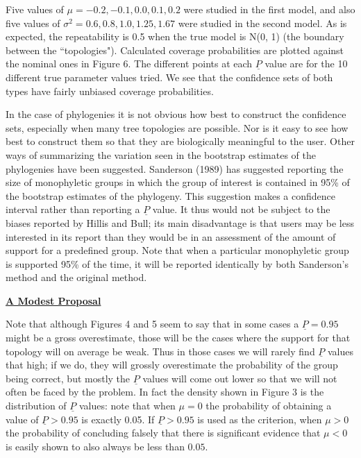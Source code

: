 {Five values of $\mu= -0.2, -0.1, 0.0, 0.1, 0.2$ were studied in the first model,
and also
five values of $\sigma^2 = 0.6, 0.8, 1.0, 1.25, 1.67$ were studied in the
second model.
As is expected, the repeatability is 0.5 when the true model is N(0, 1) (the
boundary between the ``topologies").
Calculated coverage probabilities are plotted against the nominal ones
in Figure 6.  The different
points at each $\underline{P}$ value are for the 10 different true parameter values tried.
We see that the confidence sets of both types have fairly unbiased coverage
probabilities.

In the case of phylogenies it is not obvious how best to construct the
 confidence sets, especially when
many tree topologies are possible.  Nor is it easy to see how best to
construct them so that they are biologically meaningful to the user.
Other ways of summarizing the variation seen in the bootstrap
estimates of the phylogenies have been suggested.  Sanderson (1989) has
suggested reporting the size of monophyletic groups in which the group
of interest is contained in 95\% of the bootstrap estimates of the
phylogeny. This suggestion makes a confidence interval rather
than reporting a $\underline{P}$ value.  It thus would not be subject to the biases
reported by Hillis and Bull; its main disadvantage is that users
may be less interested in its report than they would be in an assessment of the
amount of support for a predefined group.  Note that when a particular
monophyletic group is supported 95\% of the time, it will be reported
identically by both Sanderson's method and the original method.
\bigskip

\centerline{\underline{\bf A Modest Proposal}}
\bigskip

Note that although Figures 4 and 5 seem to say that
in some cases
a $\underline{P} = 0.95$ might be a gross overestimate, those will be the cases where
the support for that topology will on average be weak.  Thus in those cases we
will rarely find $\underline{P}$ values that high; if we do, they will grossly
overestimate the probability of the group being correct, but mostly the
$\underline{P}$ values will come out lower so that we will not often be faced by the
problem.  In fact the density shown in Figure 3 is the distribution of $\underline{P}$
values: note that when $\mu = 0$ the probability of obtaining a value of
$\underline{P} > 0.95$ is exactly 0.05.   If $\underline{P} > 0.95$ is used as the criterion,
when $\mu > 0$ the probability of concluding
falsely that there is significant evidence that $\mu < 0$ is easily
shown to also always be less than $0.05$.

}
